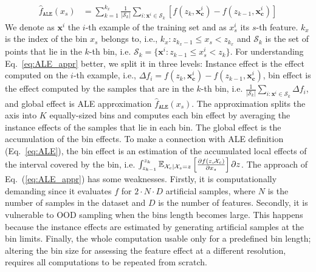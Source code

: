 \documentclass[wcp]{jmlr}
\newcommand{\xci}{\mathbf{x}^i_{\mathbf{c}}}
\newcommand{\xb}{\mathbf{x}} \newcommand{\R}{\mathbb{R}}
\newcommand{\E}{\mathbb{E}} \newcommand{\Jac}{\mathbf{J}}
\begin{document}
\begin{align} \hat{f}_{\mathtt{ALE}}(x_s) &= \sum_{k=1}^{k_x} \frac{1}{|\mathcal{S}_k|} \sum_{i:\xb^i \in \mathcal{S}_k} [f(z_k,\xci) - f(z_{k-1}, \xci)]
  \label{eq:ALE_appr}
\end{align}
%
We denote as \( \xb^i \) the \(i\)-th example of the training set and as \(x_s^i\) its \(s\)-th feature. \(k_x\) is the index of the bin \(x_s\) belongs to, i.e., \(k_x: z_{k_x-1} \leq x_s < z_{k_x} \) and \(\mathcal{S}_k\) is the set of points that lie in the \(k\)-th bin, i.e.  \( \mathcal{S}_k = \{ \xb^i : z_{k-1} \leq x^i_s < z_{k} \} \).  For understanding Eq.~\eqref{eq:ALE_appr} better, we split it in three levels: Instance effect is the effect computed on the \(i\)-th example, i.e., \(\Delta f_i = f(z_k,\xci) - f(z_{k-1}, \xci)\), bin effect is the effect computed by the samples that are in the \(k\)-th bin, i.e.  \(\frac{1}{|\mathcal{S}_k|} \sum_{i:\xb^i \in \mathcal{S}_k} \Delta f_i \), and global effect is ALE approximation \(\hat{f}_{\mathtt{ALE}}(x_s)\). The approximation splits the axis into \( K \) equally-sized bins and computes each bin effect by averaging the instance effects of the samples that lie in each bin. The global effect is the accumulation of the bin effects. To make a connection with ALE definition (Eq.~\ref{eq:ALE}), the bin effect is an estimation of the accumulated local effects of the interval covered by the bin, i.e.  \(\int_{z_{k-1}}^{z_k} \E_{\Xcb|\mathcal{X}_s=z}\left[\frac{\partial f(z,\Xcb)}{\partial x_s}\right] \partial z \).
%
The approach of Eq.~(\ref{eq:ALE_appr}) has some weaknesses. Firstly, it is computationally demanding since it evaluates \(f\) for \(2 \cdot N \cdot D\) artificial samples, where \(N\) is the number of samples in the dataset and \(D\) is the number of features.  Secondly, it is vulnerable to OOD sampling when the bins length becomes large. This happens because the instance effects are estimated by generating artificial samples at the bin limits. Finally, the whole computation usable only for a predefined bin length; altering the bin size for assessing the feature effect at a different resolution, requires all computations to be repeated from scratch.
\end{document}
